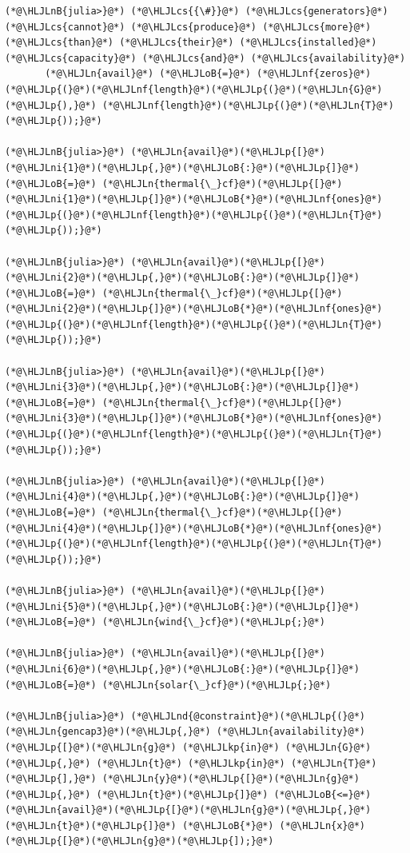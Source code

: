 \documentclass[12pt,a4paper]{article}
\newcommand{\HLJLkp}[1]{\textcolor[RGB]{148,91,176}{\textbf{#1}}}
\newcommand{\HLJLn}[1]{#1}
\newcommand{\HLJLnd}[1]{\textcolor[RGB]{214,102,97}{#1}}
\newcommand{\HLJLnf}[1]{\textcolor[RGB]{66,102,213}{#1}}
\newcommand{\HLJLnB}[1]{\textcolor[RGB]{59,151,46}{#1}}
\newcommand{\HLJLni}[1]{\textcolor[RGB]{59,151,46}{#1}}
\newcommand{\HLJLoB}[1]{\textcolor[RGB]{102,102,102}{\textbf{#1}}}
\newcommand{\HLJLp}[1]{#1}
\newcommand{\HLJLcs}[1]{\textcolor[RGB]{153,153,119}{\textit{#1}}}
\begin{document}
\begin{lstlisting}
(*@\HLJLnB{julia>}@*) (*@\HLJLcs{{\#}}@*) (*@\HLJLcs{generators}@*) (*@\HLJLcs{cannot}@*) (*@\HLJLcs{produce}@*) (*@\HLJLcs{more}@*) (*@\HLJLcs{than}@*) (*@\HLJLcs{their}@*) (*@\HLJLcs{installed}@*) (*@\HLJLcs{capacity}@*) (*@\HLJLcs{and}@*) (*@\HLJLcs{availability}@*)
       (*@\HLJLn{avail}@*) (*@\HLJLoB{=}@*) (*@\HLJLnf{zeros}@*)(*@\HLJLp{(}@*)(*@\HLJLnf{length}@*)(*@\HLJLp{(}@*)(*@\HLJLn{G}@*)(*@\HLJLp{),}@*) (*@\HLJLnf{length}@*)(*@\HLJLp{(}@*)(*@\HLJLn{T}@*)(*@\HLJLp{));}@*)

(*@\HLJLnB{julia>}@*) (*@\HLJLn{avail}@*)(*@\HLJLp{[}@*)(*@\HLJLni{1}@*)(*@\HLJLp{,}@*)(*@\HLJLoB{:}@*)(*@\HLJLp{]}@*) (*@\HLJLoB{=}@*) (*@\HLJLn{thermal{\_}cf}@*)(*@\HLJLp{[}@*)(*@\HLJLni{1}@*)(*@\HLJLp{]}@*)(*@\HLJLoB{*}@*)(*@\HLJLnf{ones}@*)(*@\HLJLp{(}@*)(*@\HLJLnf{length}@*)(*@\HLJLp{(}@*)(*@\HLJLn{T}@*)(*@\HLJLp{));}@*)

(*@\HLJLnB{julia>}@*) (*@\HLJLn{avail}@*)(*@\HLJLp{[}@*)(*@\HLJLni{2}@*)(*@\HLJLp{,}@*)(*@\HLJLoB{:}@*)(*@\HLJLp{]}@*) (*@\HLJLoB{=}@*) (*@\HLJLn{thermal{\_}cf}@*)(*@\HLJLp{[}@*)(*@\HLJLni{2}@*)(*@\HLJLp{]}@*)(*@\HLJLoB{*}@*)(*@\HLJLnf{ones}@*)(*@\HLJLp{(}@*)(*@\HLJLnf{length}@*)(*@\HLJLp{(}@*)(*@\HLJLn{T}@*)(*@\HLJLp{));}@*)

(*@\HLJLnB{julia>}@*) (*@\HLJLn{avail}@*)(*@\HLJLp{[}@*)(*@\HLJLni{3}@*)(*@\HLJLp{,}@*)(*@\HLJLoB{:}@*)(*@\HLJLp{]}@*) (*@\HLJLoB{=}@*) (*@\HLJLn{thermal{\_}cf}@*)(*@\HLJLp{[}@*)(*@\HLJLni{3}@*)(*@\HLJLp{]}@*)(*@\HLJLoB{*}@*)(*@\HLJLnf{ones}@*)(*@\HLJLp{(}@*)(*@\HLJLnf{length}@*)(*@\HLJLp{(}@*)(*@\HLJLn{T}@*)(*@\HLJLp{));}@*)

(*@\HLJLnB{julia>}@*) (*@\HLJLn{avail}@*)(*@\HLJLp{[}@*)(*@\HLJLni{4}@*)(*@\HLJLp{,}@*)(*@\HLJLoB{:}@*)(*@\HLJLp{]}@*) (*@\HLJLoB{=}@*) (*@\HLJLn{thermal{\_}cf}@*)(*@\HLJLp{[}@*)(*@\HLJLni{4}@*)(*@\HLJLp{]}@*)(*@\HLJLoB{*}@*)(*@\HLJLnf{ones}@*)(*@\HLJLp{(}@*)(*@\HLJLnf{length}@*)(*@\HLJLp{(}@*)(*@\HLJLn{T}@*)(*@\HLJLp{));}@*)

(*@\HLJLnB{julia>}@*) (*@\HLJLn{avail}@*)(*@\HLJLp{[}@*)(*@\HLJLni{5}@*)(*@\HLJLp{,}@*)(*@\HLJLoB{:}@*)(*@\HLJLp{]}@*) (*@\HLJLoB{=}@*) (*@\HLJLn{wind{\_}cf}@*)(*@\HLJLp{;}@*)

(*@\HLJLnB{julia>}@*) (*@\HLJLn{avail}@*)(*@\HLJLp{[}@*)(*@\HLJLni{6}@*)(*@\HLJLp{,}@*)(*@\HLJLoB{:}@*)(*@\HLJLp{]}@*) (*@\HLJLoB{=}@*) (*@\HLJLn{solar{\_}cf}@*)(*@\HLJLp{;}@*)

(*@\HLJLnB{julia>}@*) (*@\HLJLnd{@constraint}@*)(*@\HLJLp{(}@*)(*@\HLJLn{gencap3}@*)(*@\HLJLp{,}@*) (*@\HLJLn{availability}@*)(*@\HLJLp{[}@*)(*@\HLJLn{g}@*) (*@\HLJLkp{in}@*) (*@\HLJLn{G}@*)(*@\HLJLp{,}@*) (*@\HLJLn{t}@*) (*@\HLJLkp{in}@*) (*@\HLJLn{T}@*)(*@\HLJLp{],}@*) (*@\HLJLn{y}@*)(*@\HLJLp{[}@*)(*@\HLJLn{g}@*)(*@\HLJLp{,}@*) (*@\HLJLn{t}@*)(*@\HLJLp{]}@*) (*@\HLJLoB{<=}@*) (*@\HLJLn{avail}@*)(*@\HLJLp{[}@*)(*@\HLJLn{g}@*)(*@\HLJLp{,}@*) (*@\HLJLn{t}@*)(*@\HLJLp{]}@*) (*@\HLJLoB{*}@*) (*@\HLJLn{x}@*)(*@\HLJLp{[}@*)(*@\HLJLn{g}@*)(*@\HLJLp{]);}@*)


\end{lstlisting}
\end{document}
